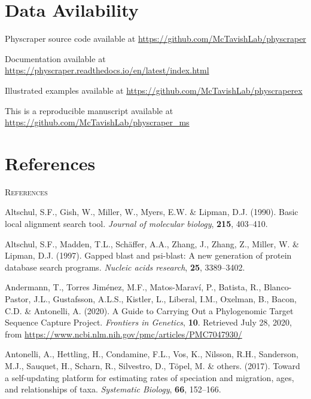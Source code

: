 \documentclass[]{article}
\begin{document}
\hypertarget{data-avilability}{%
\section{Data Avilability}\label{data-avilability}}

Physcraper source code available at \url{https://github.com/McTavishLab/physcraper}

Documentation available at \url{https://physcraper.readthedocs.io/en/latest/index.html}

Illustrated examples available at \url{https://github.com/McTavishLab/physcraperex}

This is a reproducible manuscript available at \url{https://github.com/McTavishLab/physcraper_ms}

\newpage

\hypertarget{references}{%
\section{References}\label{references}}

\newpage
\begin{center}
\textsc{References}
\end{center}

\hypertarget{refs}{}
\leavevmode\hypertarget{ref-altschul1990basic}{}%
Altschul, S.F., Gish, W., Miller, W., Myers, E.W. \& Lipman, D.J. (1990). Basic local alignment search tool. \emph{Journal of molecular biology}, \textbf{215}, 403--410.

\leavevmode\hypertarget{ref-altschul1997gapped}{}%
Altschul, S.F., Madden, T.L., Schäffer, A.A., Zhang, J., Zhang, Z., Miller, W. \& Lipman, D.J. (1997). Gapped blast and psi-blast: A new generation of protein database search programs. \emph{Nucleic acids research}, \textbf{25}, 3389--3402.

\leavevmode\hypertarget{ref-andermann2020guide}{}%
Andermann, T., Torres Jiménez, M.F., Matos-Maraví, P., Batista, R., Blanco-Pastor, J.L., Gustafsson, A.L.S., Kistler, L., Liberal, I.M., Oxelman, B., Bacon, C.D. \& Antonelli, A. (2020). A Guide to Carrying Out a Phylogenomic Target Sequence Capture Project. \emph{Frontiers in Genetics}, \textbf{10}. Retrieved July 28, 2020, from \url{https://www.ncbi.nlm.nih.gov/pmc/articles/PMC7047930/}

\leavevmode\hypertarget{ref-antonelli2017toward}{}%
Antonelli, A., Hettling, H., Condamine, F.L., Vos, K., Nilsson, R.H., Sanderson, M.J., Sauquet, H., Scharn, R., Silvestro, D., Töpel, M. \& others. (2017). Toward a self-updating platform for estimating rates of speciation and migration, ages, and relationships of taxa. \emph{Systematic Biology}, \textbf{66}, 152--166.
\end{document}
